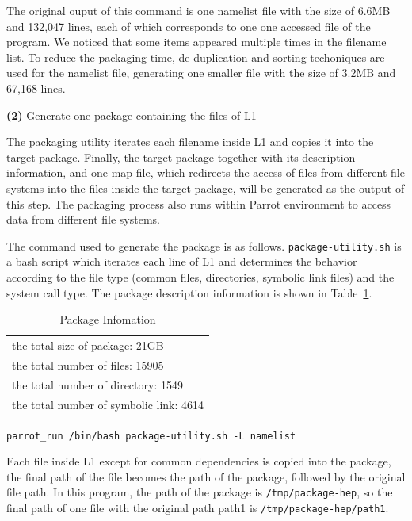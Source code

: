 \documentclass{sig-alternate}
\begin{document}
The original ouput of this command is one namelist file with the size of 6.6MB
and 132,047 lines, each of which corresponds to one one accessed file of the
program. We noticed that some items appeared multiple times in the filename list. To reduce the
packaging time, de-duplication and sorting techoniques are used for the
namelist file, generating one smaller file with the size of 3.2MB and 67,168 lines.

{\bf (2)} Generate one package containing the files of L1 

The packaging utility iterates each filename inside L1 and copies it into the
target package. Finally, the target package
together with its description information, and one map file, which redirects
the access of files from different file systems into the files inside the target package, will be
generated as the output of this step. The packaging process also runs within Parrot environment to
access data from different file systems.

The command used to generate the package is as follows. 
{\tt package-utility.sh} is a bash script which iterates each line of L1 and
determines the behavior according to the file type (common files, directories,
symbolic link files) and the system call type.
The package description information is shown in Table~\ref{table:package-info}.

\begin{table}
    \centering
    \begin{tabular}{|l|}
    \hline
     the total size of package: 21GB \\ 
    the total number of files: 15905\\ 
    the total number of directory: 1549\\ 
    the total number of symbolic link: 4614 \\ \hline 
    \end{tabular}
    \caption{Package Infomation}
    \label{table:package-info}
\end{table}

{\tt parrot\_run /bin/bash package-utility.sh -L namelist}

Each file inside L1 except for common dependencies is copied into the package, the final path of the file
becomes the path of the package, followed by the original file path. In this
program, the path of the package is {\tt /tmp/package-hep}, so the final path of one
file with the original path path1 is {\tt /tmp/package-hep/path1}.
\end{document}
